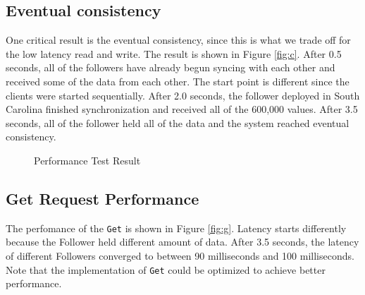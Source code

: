 \documentclass[11pt,english,twocolumn]{article}
\begin{document}
 \vspace{-0.5cm}
\subsection{Eventual consistency}
One critical result is the eventual consistency, since this is what we trade off
for the low latency read and write. The result is shown in Figure
\ref{fig:c}. After 0.5 seconds, all of the followers have already
begun syncing with each other and received some of the data from each other. The
start point is different since the clients were started sequentially. After 2.0
seconds, the follower deployed in South Carolina finished synchronization and
received all of the 600,000 values. After 3.5 seconds, all of the follower held
all of the data and the system reached eventual consistency.

\begin{figure}[h]
\caption{Performance Test Result}
\vspace{-0.4cm}
\label{ConsistencyDelay}
\end{figure}

\subsection{Get Request Performance}
The perfomance of the \texttt{Get} is shown in Figure \ref{fig:g}.
Latency starts differently because the Follower held different amount of data.
After 3.5 seconds, the latency of different Followers converged to between 90
milliseconds and 100 milliseconds. Note that the implementation of \texttt{Get}
could be optimized to achieve better performance.
\end{document}

